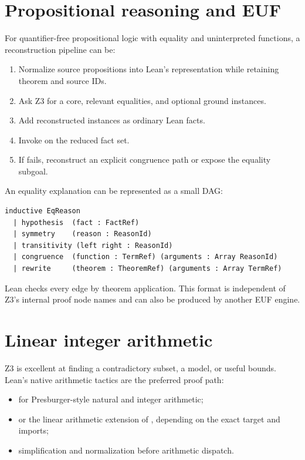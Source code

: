 \documentclass[11pt,letterpaper,openany]{report}
\newcommand{\code}[1]{\texttt{\detokenize{#1}}}
\begin{document}
\section{Propositional reasoning and EUF}

For quantifier-free propositional logic with equality and uninterpreted functions, a
reconstruction pipeline can be:

\begin{enumerate}
  \item Normalize source propositions into Lean's \code{grind} representation while
        retaining theorem and source IDs.
  \item Ask Z3 for a core, relevant equalities, and optional ground instances.
  \item Add reconstructed instances as ordinary Lean facts.
  \item Invoke \code{grind} on the reduced fact set.
  \item If \code{grind} fails, reconstruct an explicit congruence path or expose the
        equality subgoal.
\end{enumerate}

An equality explanation can be represented as a small DAG:

\begin{lstlisting}[language=LeanFour,caption={Schematic equality explanation}]
inductive EqReason
  | hypothesis  (fact : FactRef)
  | symmetry    (reason : ReasonId)
  | transitivity (left right : ReasonId)
  | congruence  (function : TermRef) (arguments : Array ReasonId)
  | rewrite     (theorem : TheoremRef) (arguments : Array TermRef)
\end{lstlisting}

Lean checks every edge by theorem application. This format is independent of Z3's
internal proof node names and can also be produced by another EUF engine.

\section{Linear integer arithmetic}

Z3 is excellent at finding a contradictory subset, a model, or useful bounds. Lean's
native arithmetic tactics are the preferred proof path:

\begin{itemize}
  \item \code{omega} for Presburger-style natural and integer arithmetic;
  \item \code{lia} or the linear arithmetic extension of \code{grind}, depending on
        the exact target and imports;
  \item simplification and normalization before arithmetic dispatch.
\end{itemize}
\end{document}

